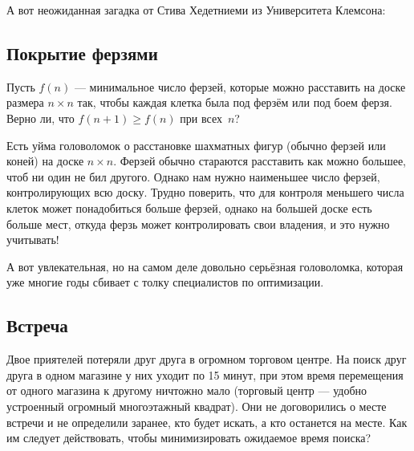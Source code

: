 
\medskip

А вот неожиданная загадка от Стива Хедетниеми из Университета Клемсона:

\subsection*{Покрытие ферзями}

Пусть $f(n)$ --- минимальное число ферзей, которые можно расставить на доске размера $n \times n$ так, чтобы каждая клетка была под ферзём или под боем ферзя.
Верно ли, что $f(n + 1) \geqslant f(n)$ при всех~$n$?

\medskip

Есть уйма головоломок о расстановке шахматных фигур (обычно ферзей или коней) на доске $n \times n$.
Ферзей обычно стараются расставить как можно большее, чтоб ни один не бил другого.
Однако нам нужно наименьшее число ферзей, контролирующих всю доску.
Трудно поверить, что для контроля меньшего числа клеток может понадобиться больше ферзей, однако на большей доске есть больше мест, откуда ферзь может контролировать свои владения, и это нужно учитывать!

\medskip

А вот увлекательная, но на самом деле довольно серьёзная головоломка, которая уже многие годы сбивает с толку специалистов по оптимизации.

\subsection*{Встреча}

Двое приятелей потеряли друг друга в огромном торговом центре. %
На поиск друг друга в одном магазине у них уходит по 15 минут,
при этом время перемещения от одного магазина к другому ничтожно мало
(торговый центр --- удобно устроенный огромный многоэтажный квадрат).
Они не договорились о месте встречи и не определили заранее, кто будет искать, а кто останется на месте.
Как им следует действовать, чтобы минимизировать ожидаемое время поиска?

